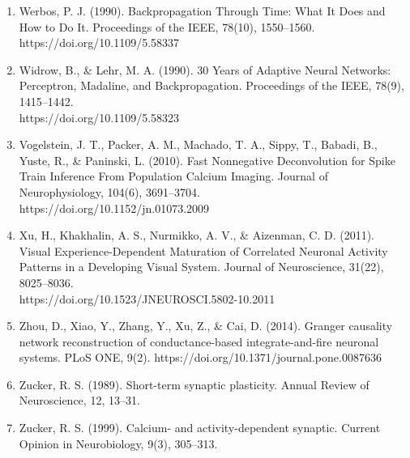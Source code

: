 \documentclass[11pt,titlepage]{article}
\begin{document}
\begin{spacing}{1}
\begin{enumerate}
\item Werbos, P. J. (1990). Backpropagation Through Time: What It Does and How to Do It. Proceedings of the IEEE, 78(10), 1550–1560. https://doi.org/10.1109/5.58337
\item Widrow, B., \& Lehr, M. A. (1990). 30 Years of Adaptive Neural Networks: Perceptron, Madaline, and Backpropagation. Proceedings of the IEEE, 78(9), 1415–1442.\\https://doi.org/10.1109/5.58323
\item Vogelstein, J. T., Packer, A. M., Machado, T. A., Sippy, T., Babadi, B., Yuste, R., \& Paninski, L. (2010). Fast Nonnegative Deconvolution for Spike Train Inference From Population Calcium Imaging. Journal of Neurophysiology, 104(6), 3691–3704.\\ https://doi.org/10.1152/jn.01073.2009
\item Xu, H., Khakhalin, A. S., Nurmikko, A. V., \& Aizenman, C. D. (2011). Visual Experience-Dependent Maturation of Correlated Neuronal Activity Patterns in a Developing Visual System. Journal of Neuroscience, 31(22), 8025–8036.\\ https://doi.org/10.1523/JNEUROSCI.5802-10.2011
\item Zhou, D., Xiao, Y., Zhang, Y., Xu, Z., \& Cai, D. (2014). Granger causality network reconstruction of conductance-based integrate-and-fire neuronal systems. PLoS ONE, 9(2). https://doi.org/10.1371/journal.pone.0087636
\item Zucker, R. S. (1989). Short-term synaptic plasticity. Annual Review of Neuroscience, 12, 13–31.
\item Zucker, R. S. (1999). Calcium- and activity-dependent synaptic. Current Opinion in Neurobiology, 9(3), 305–313.
\end{enumerate}
\end{spacing}
\end{document}
